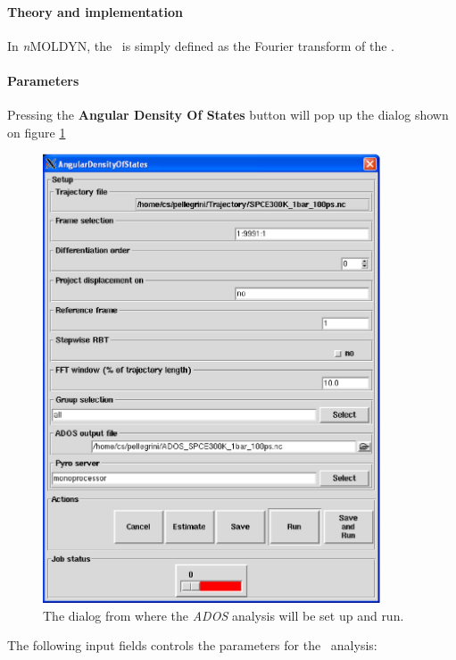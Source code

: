 \documentclass[a4paper,11pt]{report}
\begin{document}
\paragraph{Theory and implementation\\}
\label{ados_theory}
In \textit{n}MOLDYN, the \ADOS\ is simply defined as the Fourier transform of the \AVACF .

\paragraph{Parameters\\}
\label{ados_parameters}
Pressing the \textbf{Angular Density Of States} button will pop up the dialog shown on figure \ref{fig:ados}
\begin{figure}[h!]
\begin{center}
\includegraphics[width=10cm]{Figures/ados.eps}
\end{center}
\caption[The \textit{ADOS} analysis dialog]{The dialog from where the \textit{ADOS} analysis will be set up and run.}
\label{fig:ados}
\end{figure}   

The following input fields controls the parameters for the \ADOS\ analysis:
\end{document}

